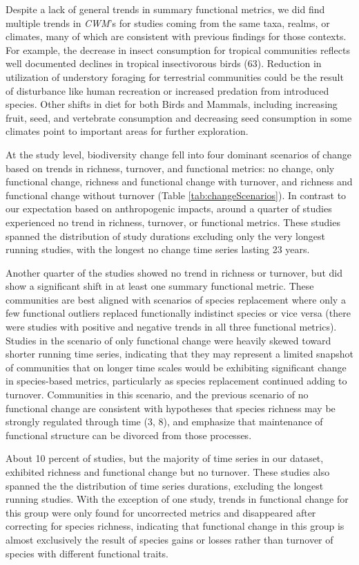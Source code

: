 \documentclass{article}
\begin{document}
Despite a lack of general trends in summary functional metrics, we did
find multiple trends in \emph{CWM}'s for studies coming from the same
taxa, realms, or climates, many of which are consistent with previous
findings for those contexts. For example, the decrease in insect
consumption for tropical communities reflects well documented declines
in tropical insectivorous birds (63). Reduction in utilization of
understory foraging for terrestrial communities could be the result of
disturbance like human recreation or increased predation from introduced
species. Other shifts in diet for both Birds and Mammals, including
increasing fruit, seed, and vertebrate consumption and decreasing seed
consumption in some climates point to important areas for further
exploration.

At the study level, biodiversity change fell into four dominant
scenarios of change based on trends in richness, turnover, and
functional metrics: no change, only functional change, richness and
functional change with turnover, and richness and functional change
without turnover (Table \ref{tab:changeScenarios}). In contrast to our
expectation based on anthropogenic impacts, around a quarter of studies
experienced no trend in richness, turnover, or functional metrics. These
studies spanned the distribution of study durations excluding only the
very longest running studies, with the longest no change time series
lasting 23 years.

Another quarter of the studies showed no trend in richness or turnover,
but did show a significant shift in at least one summary functional
metric. These communities are best aligned with scenarios of species
replacement where only a few functional outliers replaced functionally
indistinct species or vice versa (there were studies with positive and
negative trends in all three functional metrics). Studies in the
scenario of only functional change were heavily skewed toward shorter
running time series, indicating that they may represent a limited
snapshot of communities that on longer time scales would be exhibiting
significant change in species-based metrics, particularly as species
replacement continued adding to turnover. Communities in this scenario,
and the previous scenario of no functional change are consistent with
hypotheses that species richness may be strongly regulated through time
(3, 8), and emphasize that maintenance of functional structure can be
divorced from those processes.

About 10 percent of studies, but the majority of time series in our
dataset, exhibited richness and functional change but no turnover. These
studies also spanned the the distribution of time series durations,
excluding the longest running studies. With the exception of one study,
trends in functional change for this group were only found for
uncorrected metrics and disappeared after correcting for species
richness, indicating that functional change in this group is almost
exclusively the result of species gains or losses rather than turnover
of species with different functional traits.
\end{document}
